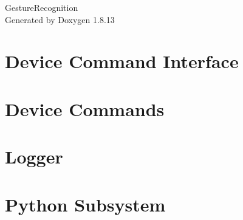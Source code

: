 \documentclass[twoside]{book}
\newcommand{\+}{\discretionary{\mbox{\scriptsize$\hookleftarrow$}}{}{}}
\newcommand{\clearemptydoublepage}{%
  \newpage{\pagestyle{empty}\cleardoublepage}%
}
\begin{document}
\hypersetup{pageanchor=false,
             bookmarksnumbered=true,
             pdfencoding=unicode
            }
\begin{titlepage}
\vspace*{7cm}
\begin{center}%
{\Large Gesture\+Recognition }\\
\vspace*{1cm}
{\large Generated by Doxygen 1.8.13}\\
\end{center}
\end{titlepage}
\clearemptydoublepage
{}
\tableofcontents
\clearemptydoublepage
{}
\hypersetup{pageanchor=true}

\chapter{Device Command Interface}
\label{md__mnt_c_Users_Adam_Documents_GestureRecognition_Python_Subsystem_DeviceCommandInterface_README}

\chapter{Device Commands}
\label{md__mnt_c_Users_Adam_Documents_GestureRecognition_Python_Subsystem_GPIO_README}

\chapter{Logger}
\label{md__mnt_c_Users_Adam_Documents_GestureRecognition_Python_Subsystem_Logging_README}

\chapter{Python Subsystem}
\label{md__mnt_c_Users_Adam_Documents_GestureRecognition_Python_Subsystem_README}

\end{document}
